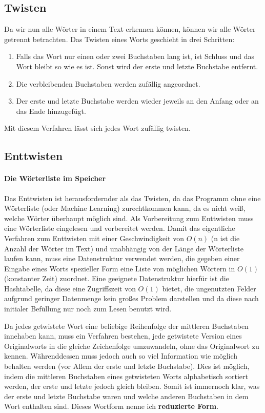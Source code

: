 \documentclass[a4paper,10pt,ngerman]{scrartcl}
\begin{document}
\subsection{Twisten}
Da wir nun alle Wörter in einem Text erkennen können, können wir alle Wörter getrennt betrachten. Das Twisten eines Worts geschieht in drei Schritten:
\begin{enumerate}
  \item Falls das Wort nur einen oder zwei Buchstaben lang ist, ist Schluss und das Wort bleibt so wie es ist. Sonst wird der erste und letzte Buchstabe entfernt. 
  \item Die verbleibenden Buchstaben werden zufällig angeordnet.
  \item Der erste und letzte Buchstabe werden wieder jeweils an den Anfang oder an das Ende hinzugefügt.
\end{enumerate}
Mit diesem Verfahren lässt sich jedes Wort zufällig twisten.

\subsection{Enttwisten}

\paragraph{Die Wörterliste im Speicher}
Das Enttwisten ist herausfordernder als das Twisten, da das Programm ohne eine Wörterliste (oder Machine Learning) zurechtkommen kann, da es nicht weiß, welche Wörter überhaupt möglich sind. Als Vorbereitung zum Enttwisten muss eine Wörterliste eingelesen und vorbereitet werden. Damit das eigentliche Verfahren zum Enttwisten mit einer Geschwindigkeit von $O(n)$ (n ist die Anzahl der Wörter im Text) und unabhängig von der Länge der Wörterliste laufen kann, muss eine Datenstruktur verwendet werden, die gegeben einer Eingabe eines Worts spezieller Form eine Liste von möglichen Wörtern in $O(1)$ (konstanter Zeit) zuordnet. Eine geeignete Datenstruktur hierfür ist die Hashtabelle, da diese eine Zugriffszeit von $O(1)$ bietet, die ungenutzten Felder aufgrund geringer Datenmenge kein großes Problem darstellen und da diese nach initialer Befüllung nur noch zum Lesen benutzt wird. 

Da jedes getwistete Wort eine beliebige Reihenfolge der mittleren Buchstaben innehaben kann, muss ein Verfahren bestehen, jede getwistete Version eines Originalworts in die gleiche Zeichenfolge umzuwandeln, ohne das Originalwort zu kennen. Währenddessen muss jedoch auch so viel Information wie möglich behalten werden (vor Allem der erste und letzte Buchstabe). Dies ist möglich, indem die mittleren Buchstaben eines getwisteten Worts alphabetisch sortiert werden, der erste und letzte jedoch gleich bleiben. Somit ist immernoch klar, was der erste und letzte Buchstabe waren und welche anderen Buchstaben in dem Wort enthalten sind. Dieses Wortform nenne ich \textbf{reduzierte Form}.
\end{document}
